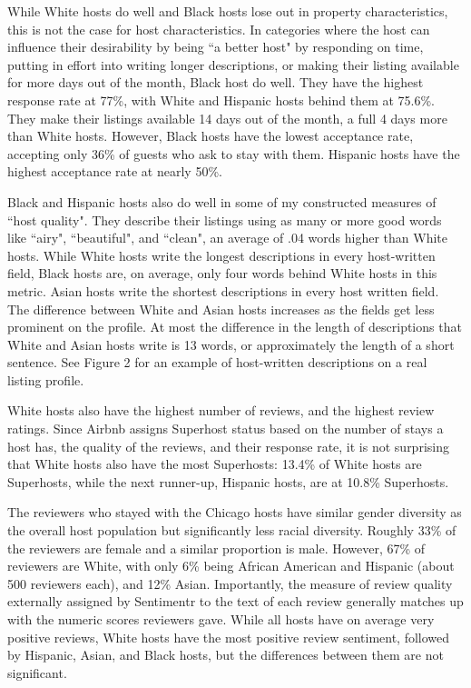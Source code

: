 \documentclass[11pt, oneside]{article}
\begin{document}
While White hosts do well and Black hosts lose out in property characteristics, this is not the case for host characteristics. In categories where the host can influence their desirability by being ``a better host" by responding on time, putting in effort into writing longer descriptions, or making their listing available for more days out of the month, Black host do well. They have the highest response rate at 77\%, with White and Hispanic hosts behind them at 75.6\%. They make their listings available 14 days out of the month, a full 4 days more than White hosts. However, Black hosts have the lowest acceptance rate, accepting only 36\% of guests who ask to stay with them. Hispanic hosts have the highest acceptance rate at nearly 50\%. 

Black and Hispanic hosts also do well in some of my constructed measures of ``host quality". They describe their listings using  as many or more good words like ``airy", ``beautiful", and ``clean", an average of .04 words higher than White hosts. While White hosts write the longest descriptions in every host-written field, Black hosts are, on average, only four words behind White hosts in this metric. Asian hosts write the shortest descriptions in every host written field. The difference between White and Asian hosts increases as the fields get less prominent on the profile. At most the difference in the length of descriptions that White and Asian hosts write is 13 words, or approximately the length of a short sentence. See Figure 2 for an example of host-written descriptions on a real listing profile. 

White hosts also have the highest number of reviews, and the highest review ratings. Since Airbnb assigns Superhost status based on the number of stays a host has, the quality of the reviews, and their response rate, it is not surprising that White hosts also have the most Superhosts: 13.4\% of White hosts are Superhosts, while the next runner-up, Hispanic hosts, are at 10.8\% Superhosts. 

The reviewers who stayed with the Chicago hosts have similar gender diversity as the overall host population but significantly less racial diversity. Roughly 33\% of the reviewers are female and a similar proportion is male. However, 67\% of reviewers are White, with only 6\% being African American and Hispanic (about 500 reviewers each), and 12\% Asian. Importantly, the measure of review quality externally assigned by Sentimentr to the text of each review generally matches up with the numeric scores reviewers gave. While all hosts have on average very positive reviews, White hosts have the most positive review sentiment, followed by Hispanic, Asian, and Black hosts, but the differences between them are not significant. 
\end{document}
